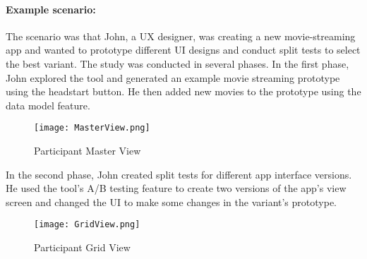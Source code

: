 
\paragraph{Example scenario:}
The scenario was that John, a UX designer, was creating a new movie-streaming app and wanted to prototype different UI designs and conduct split tests to select the best variant. 
The study was conducted in several phases.
In the first phase, John explored the tool and generated an example movie streaming prototype using the headstart button. He then added new movies to the prototype using the data model feature.
\begin{figure}[ht]
  \centering
  \texttt{[image: MasterView.png]}
  \caption[Example Participant Prototype - Screen1]{Participant Master View}
  \label{evaluation:fig:masterview}
\end{figure}

In the second phase, John created split tests for different app interface versions. 
He used the tool's A/B testing feature to create two versions of the app's view screen and changed the UI to make some changes in the variant's prototype.
\begin{figure}[ht]
  \centering
  \texttt{[image: GridView.png]}
  \caption[Example Participant Prototype - Screen2]{Participant Grid View}
  \label{evaluation:fig:gridview}
\end{figure}

